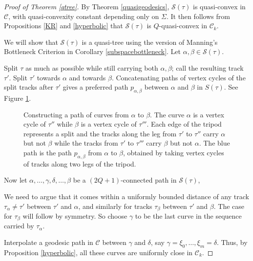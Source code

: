 \documentclass[11pt]{article}
\theoremstyle{remark}
\def\S{{\mathcal S}}
\def\C{{\mathcal C}}
\begin{document}
\begin{proof}[Proof of Theorem \ref{qtree}]
By Theorem \ref{quasigeodesics}, $\S(\tau)$ is quasi-convex in $\C$,
with quasi-convexity constant depending only on $\Sigma$.
It then follows from Propositions \ref{KR} and \ref{hyperbolic} that $\S(\tau)$ is
$Q$-quasi-convex in $\C_k$.


  We will show that $\S(\tau)$ is a quasi-tree using the version of
  Manning's Bottleneck Criterion in Corollary \ref{subspacebottleneck}.
   Let $\alpha,\beta\in \S(\tau)$.

  Split $\tau$ as much as possible while still carrying both
  $\alpha,\beta$; call the resulting track $\tau'$. Split $\tau'$ towards $\alpha$
  and towards $\beta$.
  Concatenating paths of vertex cycles of the split tracks
  after $\tau'$ gives a
  preferred path $p_{\alpha,\beta}$ between $\alpha$ and $\beta$ in $S(\tau)$.
  See Figure \ref{fig:tripod}.

  \begin{figure}[h]

  \centering

  \def\svgwidth{0.25\textwidth}
  

  \caption{Constructing a path of curves from $\alpha$ to $\beta$. The curve $\alpha$
  is a vertex cycle of $\tau''$ while $\beta$ is a vertex cycle of $\tau'''$. Each
  edge of the tripod represents a split and the tracks along the leg from $\tau'$ to
  $\tau''$ carry $\alpha$ but not $\beta$ while the tracks from $\tau'$ to $\tau'''$
  carry $\beta$ but not $\alpha$. The blue path is the path $p_{\alpha,\beta}$
  from $\alpha$ to $\beta$, obtained by taking vertex cycles of tracks along two
  legs of the tripod.}
  \label{fig:tripod}
\end{figure}

  Now let
  $\alpha,\ldots,\gamma,\delta,\ldots,\beta$ be a $(2Q+1)$-connected path in $\mathcal
    S(\tau)$,

  We need to argue that it comes within a uniformly bounded
  distance of any track $\tau_\alpha\neq\tau'$ between $\tau'$ and $\alpha$, and
  similarly for tracks $\tau_\beta$ between $\tau'$ and $\beta$.
  The case for $\tau_\beta$ will follow by symmetry. So
  choose $\gamma$ to be the
  last curve in the sequence carried by $\tau_\alpha$.

   Interpolate a geodesic path
  in $\mathcal C$ between $\gamma$ and $\delta$, say
  $\gamma=\xi_0,\ldots,\xi_m=\delta$. Thus, by Proposition \ref{hyperbolic}, all these curves
  are uniformly close in $\mathcal C_k$.


\end{proof}
\end{document}
